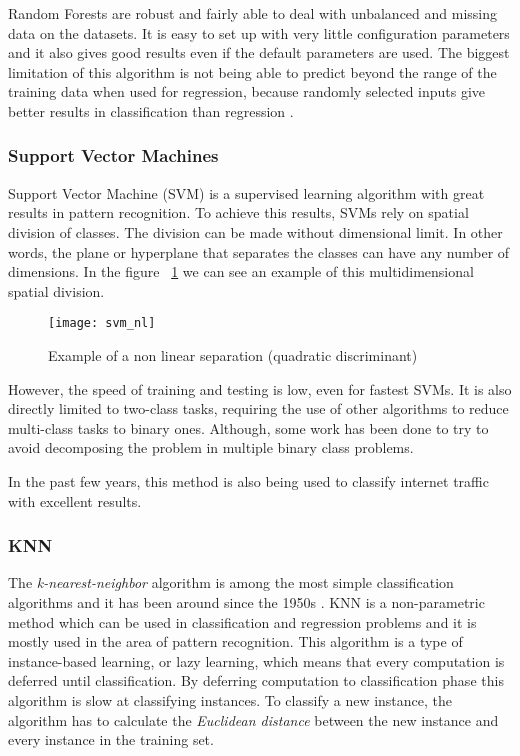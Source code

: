 Random Forests are robust and fairly able to deal with unbalanced and missing data on the datasets. It is easy to set up with very little configuration
parameters and it also gives good results even if the default parameters are used. The biggest limitation of this algorithm is not being able to
predict beyond the range of the training data when used for regression, because randomly selected inputs give better results in classification than regression \cite{raey}.

\subsubsection{Support Vector Machines}

Support Vector Machine (SVM) is a supervised learning algorithm with great results in pattern recognition.
\cite{Cortes95support-vectornetworks} To achieve this results, SVMs rely on spatial division of classes. The division can be
made without dimensional limit. In other words, the plane or hyperplane that separates the classes can have any number of dimensions. In the figure
~\ref{fig:svm_nonlin} we can see an example of this multidimensional spatial division.

\begin{figure}[h]
  \begin{center}
    \leavevmode
    \texttt{[image: svm\_nl]}
    \caption{Example of a non linear separation (quadratic discriminant)\cite{Bennett03supportvector}}
    \label{fig:svm_nonlin}
  \end{center}
\end{figure}

However, the speed of training and testing is low, even for fastest SVMs.
It is also directly limited to two-class tasks\cite{Cortes95support-vectornetworks},
requiring the use of other algorithms to reduce multi-class tasks to binary ones. Although, some work has been done to try to avoid
decomposing the problem in multiple binary class problems.\cite{Crammer:2002:AIM:944790.944813}

In the past few years, this method is also being used to classify internet traffic with excellent results.\cite{Yuan2010}


\subsubsection{KNN}

The \emph{k-nearest-neighbor} algorithm is among the most simple classification algorithms and it has been around since the 1950s \cite[p.348]{HanKam06}.
KNN is a non-parametric method which can be used in classification and regression problems and it is mostly used in the area of pattern recognition.
This algorithm is a type of instance-based learning, or lazy learning, which means that every computation is deferred until classification. By deferring 
computation to classification phase this algorithm is slow at classifying instances. To classify a new instance, the algorithm has to calculate
the \emph{Euclidean distance} between the new instance and every instance in the training set.


